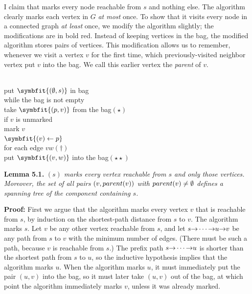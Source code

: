 I claim that  marks every node reachable from $s$ and nothing else.
The algorithm clearly marks each vertex in $G$ \textit{at most} once.
To show that it visits every node in a connected graph \textit{at least} once, we modify the algorithm slightly; the modifications are in bold red.
Instead of keeping vertices in the bag, the modified algorithm stores pairs of vertices.
This modification allows us to remember, whenever we visit a vertex $v$ for the first time, which previously-visited neighbor vertex put $v$ into the bag.
We call this earlier vertex the \textit{parent} of $v$.

\begin{pseudocode}
\\
put \mbox{\color{JEred}$\symbfit{(\emptyset, s)}$} in bag\\
while the bag is not empty\\
\Indent take \mbox{\color{JEred}$\symbfit{(p, v)}$} from the bag\hspace{1.5em}\hfill$(\star)$\\
\Indent if $v$ is unmarked\\
\Indent\Indent mark $v$\\
\Indent\Indent \mbox{\color{JEred}\mbox{\bfseries {}}$\symbfit{(v) \gets p}$}\\
\Indent\Indent for each edge $vw$\hspace{1.5em}\hfill$(\dagger)$\\
\Indent\Indent\Indent put \mbox{\color{JEred}$\symbfit{(v, w)}$} into the bag\hspace{1.5em}\hfill$(\star\star)$
\end{pseudocode}

\noindent\textbf{Lemma 5.1.} {\slshape {}$(s)$ marks every vertex reachable from $s$ and only those vertices. Moreover, the set of all pairs $(v, parent(v))$ with $parent(v) \neq \emptyset$ defines a spanning tree of the component containing $s$.}

\noindent\textbf{Proof:} First we argue that the algorithm marks every vertex $v$ that is reachable from $s$, by induction on the shortest-path distance from $s$ to $v$.
The algorithm marks $s$.
Let $v$ be any other vertex reachable from $s$, and let $s\mathord{\rightarrow}\cdots\mathord{\rightarrow}u\mathord{\rightarrow}v$ be any path from $s$ to $v$ with the minimum number of edges.
(There must be such a path, because $v$ is reachable from $s$.)
The prefix path $s\mathord{\rightarrow}\cdots\mathord{\rightarrow}u$ is shorter than the shortest path from $s$ to $u$, so the inductive hypothesis implies that the algorithm marks $u$.
When the algorithm marks $u$, it must immediately put the pair $(u, v)$ into the bag, so it must later take $(u, v)$ out of the bag, at which point the algorithm immediately marks $v$, unless it was already marked.

